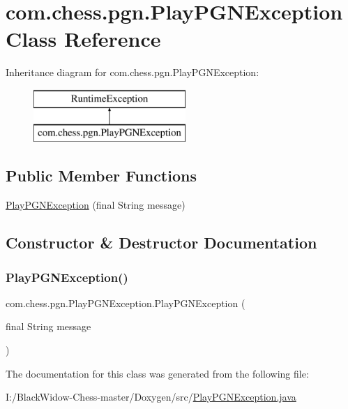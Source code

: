 \hypertarget{classcom_1_1chess_1_1pgn_1_1_play_p_g_n_exception}{}\section{com.\+chess.\+pgn.\+Play\+P\+G\+N\+Exception Class Reference}
\label{classcom_1_1chess_1_1pgn_1_1_play_p_g_n_exception}
Inheritance diagram for com.\+chess.\+pgn.\+Play\+P\+G\+N\+Exception\+:\begin{figure}[H]
\begin{center}
\leavevmode
\includegraphics[height=2.000000cm]{classcom_1_1chess_1_1pgn_1_1_play_p_g_n_exception}
\end{center}
\end{figure}
\subsection*{Public Member Functions}
\begin{DoxyCompactItemize}
\item 
\mbox{\hyperlink{classcom_1_1chess_1_1pgn_1_1_play_p_g_n_exception_ae4f4bf70167a43b229142806dcfa8d36}{Play\+P\+G\+N\+Exception}} (final String message)
\end{DoxyCompactItemize}


\subsection{Constructor \& Destructor Documentation}
\mbox{\label{classcom_1_1chess_1_1pgn_1_1_play_p_g_n_exception_ae4f4bf70167a43b229142806dcfa8d36}} 
\subsubsection{\texorpdfstring{PlayPGNException()}{PlayPGNException()}}
{\footnotesize\ttfamily com.\+chess.\+pgn.\+Play\+P\+G\+N\+Exception.\+Play\+P\+G\+N\+Exception (\begin{DoxyParamCaption}\item[{final String}]{message }\end{DoxyParamCaption})}



The documentation for this class was generated from the following file\+:\begin{DoxyCompactItemize}
\item 
I\+:/\+Black\+Widow-\/\+Chess-\/master/\+Doxygen/src/\mbox{\hyperlink{_play_p_g_n_exception_8java}{Play\+P\+G\+N\+Exception.\+java}}\end{DoxyCompactItemize}

